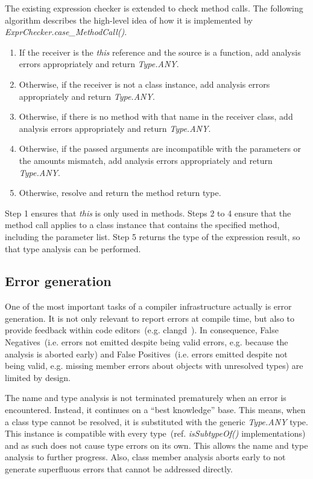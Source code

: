 \documentclass[]{tukportfolio}
\begin{document}
The existing expression checker is extended to check method calls. The following algorithm describes the high-level idea of how it is implemented by \textit{ExprChecker.case\_MethodCall()}.

\begin{enumerate}
  \item If the receiver is the \textit{this} reference and the source is a function, add analysis errors appropriately and return \textit{Type.ANY}.
  \item Otherwise, if the receiver is not a class instance, add analysis errors appropriately and return \textit{Type.ANY}.
  \item Otherwise, if there is no method with that name in the receiver class, add analysis errors appropriately and return \textit{Type.ANY}.
  \item Otherwise, if the passed arguments are incompatible with the parameters or the amounts mismatch, add analysis errors appropriately and return \textit{Type.ANY}.
  \item Otherwise, resolve and return the method return type.
\end{enumerate}

Step 1 ensures that \textit{this} is only used in methods. Steps 2 to 4 ensure that the method call applies to a class instance that contains the specified method, including the parameter list. Step 5 returns the type of the expression result, so that type analysis can be performed.

\subsection{Error generation}
\label{subsec:errorgen}

One of the most important tasks of a compiler infrastructure actually is error generation. It is not only relevant to report errors at compile time, but also to provide feedback within code editors~(e.g. clangd~\cite{clangddocs}). In consequence, False Negatives~(i.e. errors not emitted despite being valid errors, e.g. because the analysis is aborted early) and False Positives~(i.e. errors emitted despite not being valid, e.g. missing member errors about objects with unresolved types) are limited by design.

The name and type analysis is not terminated prematurely when an error is encountered. Instead, it continues on a ``best knowledge'' base. This means, when a class type cannot be resolved, it is substituted with the generic \textit{Type.ANY} type. This instance is compatible with every type~(ref. \textit{isSubtypeOf()} implementations) and as such does not cause type errors on its own. This allows the name and type analysis to further progress. Also, class member analysis aborts early to not generate superfluous errors that cannot be addressed directly.
\end{document}
